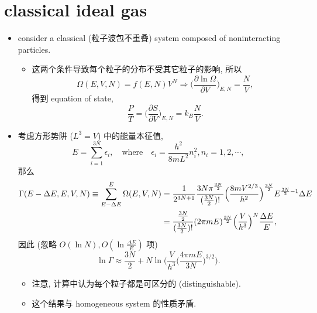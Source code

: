 \section{classical ideal gas} \label{1.2}
\begin{itemize}
	\item consider a classical (粒子波包不重叠) system composed of noninteracting particles.
	\begin{itemize}
		\item 这两个条件导致每个粒子的分布不受其它粒子的影响, 所以
		\begin{equation}
			\Omega(E, V, N) = f(E, N) V^N \Longrightarrow \Big( \frac{\partial \ln \Omega}{\partial V} \Big)_{E, N} = \frac{N}{V},
		\end{equation}
		得到 equation of state,
		\begin{equation}
			\frac{P}{T} = \Big( \frac{\partial S}{\partial V} \Big)_{E, N} = k_B \frac{N}{V}.
		\end{equation}
	\end{itemize}
	
	\item 考虑方形势阱 ($L^3 = V$) 中的能量本征值,
	\begin{equation}
		E = \sum_{i = 1}^{3 N} \epsilon_i, \quad \text{where} \quad \epsilon_i = \frac{h^2}{8 m L^2} n_i^2, n_i = 1, 2, \cdots,
	\end{equation}
	那么
	\begin{align}
		\Gamma(E - \Delta E, E,  V, N) \equiv \sum_{E - \Delta E}^E \Omega(E, V, N) &= \frac{1}{2^{3 N + 1}} \frac{3 N \pi^{\frac{3 N}{2}}}{(\frac{3 N}{2})!} \Big( \frac{8 m V^{2 / 3}}{h^2} \Big)^{\frac{3 N}{2}} E^{\frac{3 N}{2} - 1} \Delta E \notag \\
		&= \frac{\frac{3 N}{2}}{(\frac{3 N}{2})!} (2 \pi m E)^{\frac{3 N}{2}} \Big( \frac{V}{h^3} \Big)^N \frac{\Delta E}{E},
	\end{align}
	因此 (忽略 $O(\ln N), O(\ln \frac{\Delta E}{E})$ 项)
	\begin{equation} \label{1.2.5}
		\ln \Gamma \approx \frac{3 N}{2} + N \ln \Big( \frac{V}{h^3} \Big( \frac{4 \pi m E}{3 N} \Big)^{3 / 2} \Big).
	\end{equation}
	\begin{itemize}
		\item 注意, 计算中认为每个粒子都是可区分的 (distinguishable).
		
		\item 这个结果与 homogeneous system 的性质矛盾.
	\end{itemize}
	

\end{itemize}
